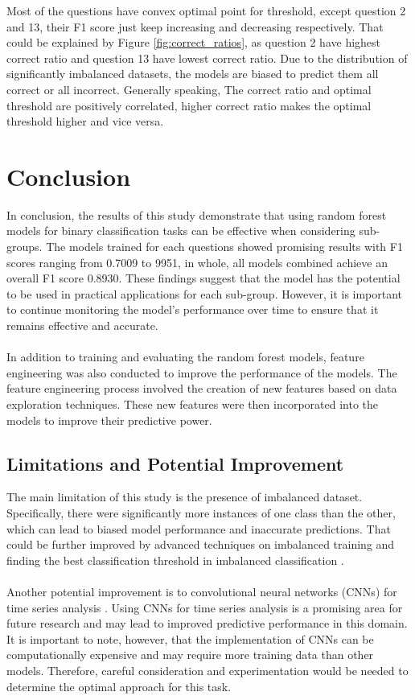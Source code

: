 \documentclass[11pt,a4paper]{article}
\begin{document}
    \noindent
    Most of the questions have convex optimal point for threshold, except question 2 and 13, their F1 score just keep increasing and decreasing respectively. That could be explained by Figure \ref{fig:correct_ratios}, as question 2 have highest correct ratio and question 13 have lowest correct ratio. Due to the distribution of significantly imbalanced datasets, the models are biased to predict them all correct or all incorrect. Generally speaking, The correct ratio and optimal threshold are positively correlated, higher correct ratio makes the optimal threshold higher and vice versa.

    \section{Conclusion}
    In conclusion, the results of this study demonstrate that using random forest models for binary classification tasks can be effective when considering sub-groups. The models trained for each questions showed promising results with F1 scores ranging from 0.7009 to 9951, in whole, all models combined achieve an overall F1 score 0.8930. These findings suggest that the model has the potential to be used in practical applications for each sub-group. However, it is important to continue monitoring the model's performance over time to ensure that it remains effective and accurate. \\
    \\
    In addition to training and evaluating the random forest models, feature engineering was also conducted to improve the performance of the models. The feature engineering process involved the creation of new features based on data exploration techniques. These new features were then incorporated into the models to improve their predictive power.
    
    \subsection{Limitations and Potential Improvement}
    The main limitation of this study is the presence of imbalanced dataset. Specifically, there were significantly more instances of one class than the other, which can lead to biased model performance and inaccurate predictions. That could be further improved by advanced techniques on imbalanced training and finding the best classification threshold in imbalanced classification \cite{ZOU20162}. \\
    \\
    Another potential improvement is to convolutional neural networks (CNNs) for time series analysis \cite{7870510}. Using CNNs for time series analysis is a promising area for future research and may lead to improved predictive performance in this domain. It is important to note, however, that the implementation of CNNs can be computationally expensive and may require more training data than other models. Therefore, careful consideration and experimentation would be needed to determine the optimal approach for this task.
\end{document}
